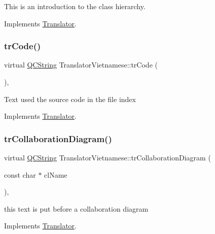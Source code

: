 This is an introduction to the class hierarchy. 

Implements \mbox{\hyperlink{class_translator}{Translator}}.

\mbox{\label{class_translator_vietnamese_af5e1593513ce7aafed1ac2588b362a31}} 
\subsubsection{\texorpdfstring{trCode()}{trCode()}}
{\footnotesize\ttfamily virtual \mbox{\hyperlink{class_q_c_string}{Q\+C\+String}} Translator\+Vietnamese\+::tr\+Code (\begin{DoxyParamCaption}{ }\end{DoxyParamCaption})\hspace{0.3cm}{\ttfamily [inline]}, {\ttfamily [virtual]}}

Text used the source code in the file index 

Implements \mbox{\hyperlink{class_translator}{Translator}}.

\mbox{\label{class_translator_vietnamese_abf5be0ae5736253b2850de144ef93787}} 
\subsubsection{\texorpdfstring{trCollaborationDiagram()}{trCollaborationDiagram()}}
{\footnotesize\ttfamily virtual \mbox{\hyperlink{class_q_c_string}{Q\+C\+String}} Translator\+Vietnamese\+::tr\+Collaboration\+Diagram (\begin{DoxyParamCaption}\item[{const char $\ast$}]{cl\+Name }\end{DoxyParamCaption})\hspace{0.3cm}{\ttfamily [inline]}, {\ttfamily [virtual]}}

this text is put before a collaboration diagram 

Implements \mbox{\hyperlink{class_translator}{Translator}}.

\mbox{\label{class_translator_vietnamese_a1b6a6f720a294de34f35740fcbd051e7}} 
